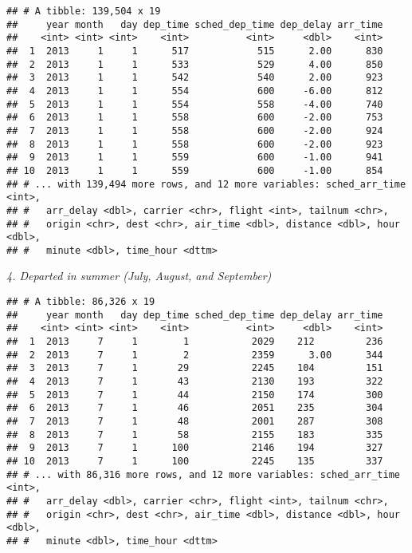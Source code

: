\documentclass[]{article}
\newenvironment{Shaded}{\begin{snugshade}}{\end{snugshade}}
\newcommand{\KeywordTok}[1]{\textcolor[rgb]{0.13,0.29,0.53}{\textbf{#1}}}
\newcommand{\DecValTok}[1]{\textcolor[rgb]{0.00,0.00,0.81}{#1}}
\newcommand{\StringTok}[1]{\textcolor[rgb]{0.31,0.60,0.02}{#1}}
\newcommand{\OperatorTok}[1]{\textcolor[rgb]{0.81,0.36,0.00}{\textbf{#1}}}
\newcommand{\NormalTok}[1]{#1}
\theoremstyle{definition}
\theoremstyle{definition}
\theoremstyle{definition}
\theoremstyle{remark}
\begin{document}
\begin{verbatim}
## # A tibble: 139,504 x 19
##     year month   day dep_time sched_dep_time dep_delay arr_time
##    <int> <int> <int>    <int>          <int>     <dbl>    <int>
##  1  2013     1     1      517            515      2.00      830
##  2  2013     1     1      533            529      4.00      850
##  3  2013     1     1      542            540      2.00      923
##  4  2013     1     1      554            600     -6.00      812
##  5  2013     1     1      554            558     -4.00      740
##  6  2013     1     1      558            600     -2.00      753
##  7  2013     1     1      558            600     -2.00      924
##  8  2013     1     1      558            600     -2.00      923
##  9  2013     1     1      559            600     -1.00      941
## 10  2013     1     1      559            600     -1.00      854
## # ... with 139,494 more rows, and 12 more variables: sched_arr_time <int>,
## #   arr_delay <dbl>, carrier <chr>, flight <int>, tailnum <chr>,
## #   origin <chr>, dest <chr>, air_time <dbl>, distance <dbl>, hour <dbl>,
## #   minute <dbl>, time_hour <dttm>
\end{verbatim}

\emph{4. Departed in summer (July, August, and September)}

\begin{Shaded}
\end{Shaded}

\begin{verbatim}
## # A tibble: 86,326 x 19
##     year month   day dep_time sched_dep_time dep_delay arr_time
##    <int> <int> <int>    <int>          <int>     <dbl>    <int>
##  1  2013     7     1        1           2029    212         236
##  2  2013     7     1        2           2359      3.00      344
##  3  2013     7     1       29           2245    104         151
##  4  2013     7     1       43           2130    193         322
##  5  2013     7     1       44           2150    174         300
##  6  2013     7     1       46           2051    235         304
##  7  2013     7     1       48           2001    287         308
##  8  2013     7     1       58           2155    183         335
##  9  2013     7     1      100           2146    194         327
## 10  2013     7     1      100           2245    135         337
## # ... with 86,316 more rows, and 12 more variables: sched_arr_time <int>,
## #   arr_delay <dbl>, carrier <chr>, flight <int>, tailnum <chr>,
## #   origin <chr>, dest <chr>, air_time <dbl>, distance <dbl>, hour <dbl>,
## #   minute <dbl>, time_hour <dttm>
\end{verbatim}
\end{document}
